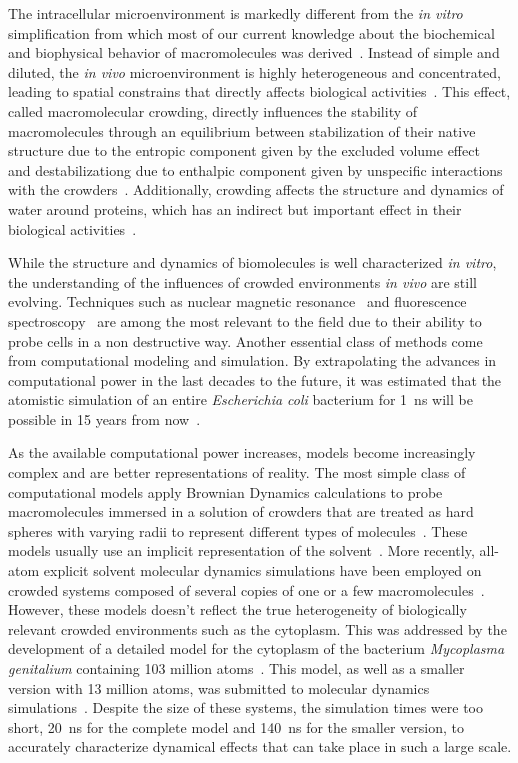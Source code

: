 \documentclass[journal=jacsat,manuscript=article]{achemso}
\begin{document}
The intracellular microenvironment is markedly different from the \textit{in vitro} simplification from which most of our current knowledge about the biochemical and biophysical behavior of macromolecules was derived~\cite{Feig2017a}. Instead of simple and diluted, the \textit{in vivo} microenvironment is highly heterogeneous and concentrated, leading to spatial constrains that directly affects biological activities~\citep{ostrowska2019}. This effect, called macromolecular crowding, directly influences the stability of macromolecules through an equilibrium between stabilization of their native structure due to the entropic component given by the excluded volume effect~\cite{cheung2005} and destabilizationg due to enthalpic component given by unspecific interactions with the crowders~\cite{Feig2011,miklos2011,Wang2012b}. Additionally, crowding affects the structure and dynamics of water around proteins, which has an indirect but important effect in their biological activities~\cite{Harada2012a,king2013}.

While the structure and dynamics of biomolecules is well characterized \textit{in vitro}, the understanding of the influences of crowded environments \textit{in vivo} are still evolving.  Techniques such as nuclear magnetic resonance~\cite{reckel2007,pielak2008} and fluorescence spectroscopy~\cite{ignatova2004,xie2008,English2011} are among the most relevant to the field due to their ability to probe cells in a non destructive way. Another essential class of methods come from computational modeling and simulation. By extrapolating the advances in computational power in the last decades to the future, it was estimated that the atomistic simulation of an entire \textit{Escherichia coli} bacterium for \SI{1}{\nano\second} will be possible in 15 years from now~\cite{vanGunsteren2006a}.

As the available computational power increases, models become increasingly complex and are better representations of reality. The most simple class of computational models apply Brownian Dynamics calculations to probe macromolecules immersed in a solution of crowders that are treated as hard spheres with varying radii to represent different types of molecules~\cite{Ando2010}. These models usually use an implicit representation of the solvent~\cite{Mcguffee2010}. More recently, all-atom explicit solvent molecular dynamics simulations have been employed on crowded systems composed of several copies of one or a few macromolecules~\cite{Wang2017c}. However, these models doesn't reflect the true heterogeneity of biologically relevant crowded environments such as the cytoplasm. This was addressed by the development of a detailed model for the cytoplasm of the bacterium \textit{Mycoplasma genitalium} containing 103 million atoms~\cite{Feig2015}. This model, as well as a smaller version with 13 million atoms, was submitted to molecular dynamics simulations~\cite{Yu2016a}. Despite the size of these systems, the simulation times were too short, \SI{20}{\nano\second} for the complete model and \SI{140}{\nano\second} for the smaller version, to accurately characterize dynamical effects that can take place in such a large scale.
\end{document}
